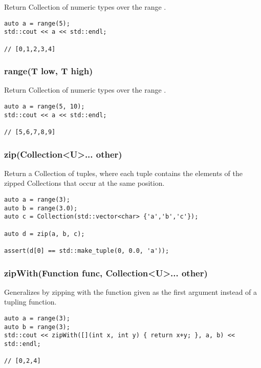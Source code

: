Return Collection of numeric types over the range \code{[0, size)}.

\begin{lstlisting}[title=example]
auto a = range(5);
std::cout << a << std::endl;

// [0,1,2,3,4]
\end{lstlisting}




\subsubsection{range(T low, T high)}

Return Collection of numeric types over the range \code{[low, high)}.

\begin{lstlisting}[title=example]
auto a = range(5, 10);
std::cout << a << std::endl;

// [5,6,7,8,9]
\end{lstlisting}





\subsubsection{zip(Collection<U>... other)}

Return a Collection of tuples, where each tuple contains the elements of the zipped Collections that occur at the same position.

\begin{lstlisting}[title=example]
auto a = range(3);
auto b = range(3.0);
auto c = Collection(std::vector<char> {'a','b','c'});

auto d = zip(a, b, c);

assert(d[0] == std::make_tuple(0, 0.0, 'a'));
\end{lstlisting}




\subsubsection{zipWith(Function func, Collection<U>... other)}
Generalizes  by zipping with the function given as the first argument instead of a tupling function.

\begin{lstlisting}[title=example]
auto a = range(3);
auto b = range(3);
std::cout << zipWith([](int x, int y) { return x+y; }, a, b) << std::endl;

// [0,2,4]
\end{lstlisting}


